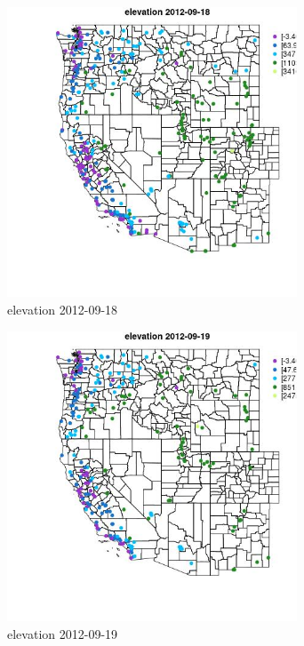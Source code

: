 \begin{figure} 
\centering  
\includegraphics[width=0.77\textwidth]{Code_Outputs/ML_input_report_ML_input_PM25_Step5_part_d_de_duplicated_aves_ML_input_MapObselevation2012-09-18.jpg} 
\caption{\label{fig:ML_input_report_ML_input_PM25_Step5_part_d_de_duplicated_aves_ML_inputMapObselevation2012-09-18}elevation 2012-09-18} 
\end{figure} 
 

\clearpage 

\begin{figure} 
\centering  
\includegraphics[width=0.77\textwidth]{Code_Outputs/ML_input_report_ML_input_PM25_Step5_part_d_de_duplicated_aves_ML_input_MapObselevation2012-09-19.jpg} 
\caption{\label{fig:ML_input_report_ML_input_PM25_Step5_part_d_de_duplicated_aves_ML_inputMapObselevation2012-09-19}elevation 2012-09-19} 
\end{figure} 
 

